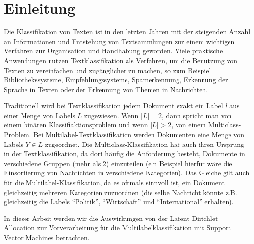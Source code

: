\section{Einleitung}

\begin{comment}
Einführung und Einbettung des Problems
Was ist die konkrete Problemstellung / Fragestellung der Arbeit
Literature Review
\end{comment}

Die Klassifikation von Texten ist in den letzten Jahren mit der steigenden Anzahl an Informationen und Entstehung von Textsammlungen zur einem wichtigen Verfahren zur Organisation und Handhabung geworden.
Viele praktische Anwendungen nutzen Textklassifikation als Verfahren, um die Benutzung von Texten zu vereinfachen und zugänglicher zu machen, so zum Beispiel Bibliothekssysteme, Empfehlungssysteme, Spamerkennung, Erkennung der Sprache in Texten oder der Erkennung von Themen in Nachrichten.

Traditionell wird bei Textklassifikation jedem Dokument exakt ein Label $l$ aus einer Menge von Labels $L$ zugewiesen.
Wenn $|L| = 2$, dann spricht man von einem binären Klassifiaktionsproblem und wenn $|L| > 2$, von einem Multiclass-Problem.
Bei Multilabel-Textklassifikation werden Dokumenten eine Menge von Labels $Y \in L$ zugeordnet.
Die Multiclass-Klassifikation hat auch ihren Ursprung in der Textklassifikation, da dort häufig die Anforderung besteht, Dokumente in verschiedene Gruppen (mehr als 2) einzuteilen (ein Beispiel hierfür wäre die Einsortierung von Nachrichten in verschiedene Kategorien).
Das Gleiche gilt auch für die Multilabel-Klassifikation, da es oftmals sinnvoll ist, ein Dokument gleichzeitig mehreren Kategorien zuzuordnen (die selbe Nachricht könnte z.B. gleichzeitig die Labels ``Politik'', ``Wirtschaft'' und ``International'' erhalten).

In dieser Arbeit werden wir die Auswirkungen von der Latent Dirichlet Allocation zur Vorverarbeitung für die Multilabelklassifikation mit Support Vector Machines betrachten.


